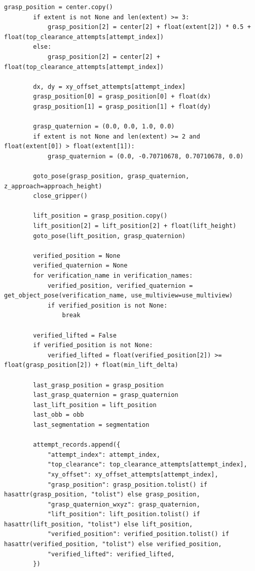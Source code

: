 \begin{lstlisting}[style=ratsappendixpython]
        grasp_position = center.copy()
        if extent is not None and len(extent) >= 3:
            grasp_position[2] = center[2] + float(extent[2]) * 0.5 + float(top_clearance_attempts[attempt_index])
        else:
            grasp_position[2] = center[2] + float(top_clearance_attempts[attempt_index])

        dx, dy = xy_offset_attempts[attempt_index]
        grasp_position[0] = grasp_position[0] + float(dx)
        grasp_position[1] = grasp_position[1] + float(dy)

        grasp_quaternion = (0.0, 0.0, 1.0, 0.0)
        if extent is not None and len(extent) >= 2 and float(extent[0]) > float(extent[1]):
            grasp_quaternion = (0.0, -0.70710678, 0.70710678, 0.0)

        goto_pose(grasp_position, grasp_quaternion, z_approach=approach_height)
        close_gripper()

        lift_position = grasp_position.copy()
        lift_position[2] = lift_position[2] + float(lift_height)
        goto_pose(lift_position, grasp_quaternion)

        verified_position = None
        verified_quaternion = None
        for verification_name in verification_names:
            verified_position, verified_quaternion = get_object_pose(verification_name, use_multiview=use_multiview)
            if verified_position is not None:
                break

        verified_lifted = False
        if verified_position is not None:
            verified_lifted = float(verified_position[2]) >= float(grasp_position[2]) + float(min_lift_delta)

        last_grasp_position = grasp_position
        last_grasp_quaternion = grasp_quaternion
        last_lift_position = lift_position
        last_obb = obb
        last_segmentation = segmentation

        attempt_records.append({
            "attempt_index": attempt_index,
            "top_clearance": top_clearance_attempts[attempt_index],
            "xy_offset": xy_offset_attempts[attempt_index],
            "grasp_position": grasp_position.tolist() if hasattr(grasp_position, "tolist") else grasp_position,
            "grasp_quaternion_wxyz": grasp_quaternion,
            "lift_position": lift_position.tolist() if hasattr(lift_position, "tolist") else lift_position,
            "verified_position": verified_position.tolist() if hasattr(verified_position, "tolist") else verified_position,
            "verified_lifted": verified_lifted,
        })


\end{lstlisting}
